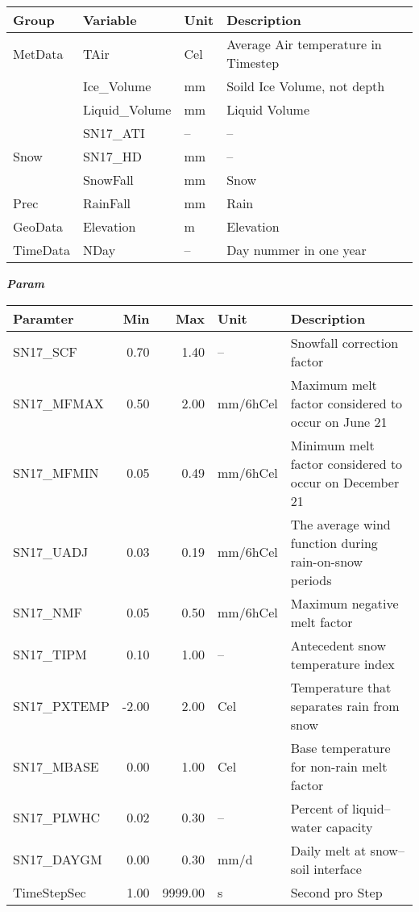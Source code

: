 \documentclass[
]{book}
\begin{document}
\begin{table}[!h]
\centering
\begin{tabular}{l|l|l|l}
\hline
Group & Variable & Unit & Description\\
\hline
MetData & TAir & Cel & Average Air temperature in Timestep\\
\cline{1-4}
 & Ice\_Volume & mm & Soild Ice Volume, not depth\\
\cline{2-4}
 & Liquid\_Volume & mm & Liquid Volume\\
\cline{2-4}
 & SN17\_ATI & -- & --\\
\cline{2-4}
\multirow{-4}{*}{\raggedright\arraybackslash Snow} & SN17\_HD & mm & --\\
\cline{1-4}
 & SnowFall & mm & Snow\\
\cline{2-4}
\multirow{-2}{*}{\raggedright\arraybackslash Prec} & RainFall & mm & Rain\\
\cline{1-4}
GeoData & Elevation & m & Elevation\\
\cline{1-4}
TimeData & NDay & -- & Day nummer in one year\\
\hline
\end{tabular}
\end{table}

\textbf{\emph{Param}}

\begin{table}[!h]
\centering
\begin{tabular}{l|r|r|l|l}
\hline
Paramter & Min & Max & Unit & Description\\
\hline
SN17\_SCF & 0.70 & 1.40 & -- & Snowfall correction factor\\
\cline{1-5}
SN17\_MFMAX & 0.50 & 2.00 & mm/6hCel & Maximum melt factor considered to occur on June 21\\
\cline{1-5}
SN17\_MFMIN & 0.05 & 0.49 & mm/6hCel & Minimum melt factor considered to occur on December 21\\
\cline{1-5}
SN17\_UADJ & 0.03 & 0.19 & mm/6hCel & The average wind function during rain-on-snow periods\\
\cline{1-5}
SN17\_NMF & 0.05 & 0.50 & mm/6hCel & Maximum negative melt factor\\
\cline{1-5}
SN17\_TIPM & 0.10 & 1.00 & -- & Antecedent snow temperature index\\
\cline{1-5}
SN17\_PXTEMP & -2.00 & 2.00 & Cel & Temperature that separates rain from snow\\
\cline{1-5}
SN17\_MBASE & 0.00 & 1.00 & Cel & Base temperature for non-rain melt factor\\
\cline{1-5}
SN17\_PLWHC & 0.02 & 0.30 & -- & Percent of liquid–water capacity\\
\cline{1-5}
SN17\_DAYGM & 0.00 & 0.30 & mm/d & Daily melt at snow–soil interface\\
\cline{1-5}
TimeStepSec & 1.00 & 9999.00 & s & Second pro Step\\
\hline
\end{tabular}
\end{table}
\end{document}
